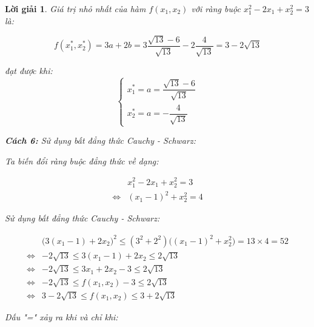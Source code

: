 \documentclass[14pt, a4paper]{article}
\theoremstyle{sltheorem}
\theoremstyle{soltheorem}
\newtheorem*{loigiai}{Lời giải}
\begin{document}
\begin{loigiai}
        Giá trị nhỏ nhất của hàm $f(x_1, x_2)$ với ràng buộc $x_1^2 - 2x_1 + x_2^2 = 3$ là:

        \begin{equation*}
            f(x_1^*, x_2^*) = 3 a + 2b = 3 \dfrac{\sqrt{13} - 6}{\sqrt{13}} - 2 \dfrac{4}{\sqrt{13}}  = 3 - 2\sqrt{13}
        \end{equation*}

        đạt được khi:
        \begin{equation*}
            \begin{cases} 
                x_1^* = a = \dfrac{\sqrt{13} - 6}{\sqrt{13}} \\ 
                x_2^* = a = - \dfrac{4}{\sqrt{13}} 
            \end{cases}
        \end{equation*}

        \textbf{Cách 6:} Sử dụng bất đẳng thức Cauchy - Schwarz:

        Ta biến đổi ràng buộc đẳng thức về dạng:

        \begin{equation*}
            \begin{aligned}
            &x_1^2 - 2x_1 + x_2^2 = 3 \\
            \Leftrightarrow & (x_1 - 1)^2 + x_2^2 = 4
            \end{aligned}
        \end{equation*}

        Sử dụng bất đẳng thức Cauchy - Schwarz:

        \begin{equation*}
            \begin{aligned}
            &\Big ( 3(x_1 - 1) + 2x_2 \Big )^2 \leq (3^2 + 2^2)\Big ( (x_1 - 1)^2 + x_2^2 \Big) = 13\times4 = 52 \\
            \Leftrightarrow & - 2\sqrt{13} \leq 3(x_1 - 1) + 2x_2 \leq 2 \sqrt{13} \\
            \Leftrightarrow & - 2 \sqrt{13} \leq 3 x_1 + 2 x_2 - 3 \leq 2 \sqrt{13} \\
            \Leftrightarrow & - 2 \sqrt{13} \leq f(x_1, x_2) - 3 \leq 2 \sqrt{13} \\
            \Leftrightarrow & 3 - 2 \sqrt{13} \leq f(x_1, x_2) \leq 3 + 2 \sqrt{13}
            \end{aligned}
        \end{equation*}

        Dấu "=" xảy ra khi và chỉ khi:


\end{loigiai}
\end{document}
